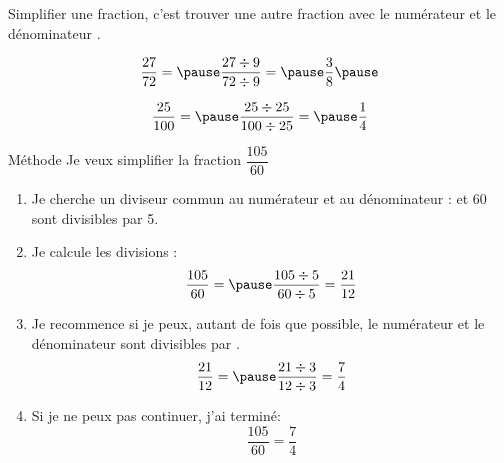 \documentclass[xcolor={dvipsnames}]{beamer}
\begin{document}
\begin{frame}
	\begin{mydef}
		Simplifier une fraction, c'est trouver une autre fraction  avec le numérateur et le dénominateur .\pause
	\end{mydef}
	
	\begin{myex}

			\begin{equation*}
			\dfrac{\num{27}}{\num{72}} = \pause \dfrac{\num{27} \div 9 }{\num{72} \div 9 } = \pause \dfrac{\num{3}}{\num{8}} \pause
			\end{equation*}	
			
			\begin{equation*}
			\dfrac{\num{25}}{\num{100}} = \pause \dfrac{\num{25} \div 25 }{\num{100} \div 25 } = \pause \dfrac{\num{1}}{\num{4}} 
			\end{equation*}	

	\end{myex}
\end{frame}


\begin{frame}
	\begin{block}{Méthode}
		Je veux simplifier la fraction $\dfrac{105}{60}$ \pause
		
		\begin{enumerate}
				\item Je cherche un diviseur commun au numérateur et au dénominateur :  et 60 sont divisibles par 5.
			\item Je calcule les divisions :
			\begin{equation*}
				\frac{105}{60} = \pause \frac{105 \div 5}{60 \div 5 } = \frac{21}{12}
			\end{equation*}
		
			\vspace*{-0.3cm}
			\item Je recommence si je peux, autant de fois que possible, le numérateur et le dénominateur sont divisibles par .
			\begin{equation*}
				\frac{21}{12} = \pause \frac{21 \div 3}{12 \div 3} = \frac{7}{4}		
			\end{equation*}
			
			\vspace*{-0.3cm}
			\item Si je ne peux pas continuer, j'ai terminé:
			\begin{equation*}
				\frac{105}{60} = \frac{7}{4}		
			\end{equation*}
		\end{enumerate}
	\end{block}
\end{frame}
\end{document}
